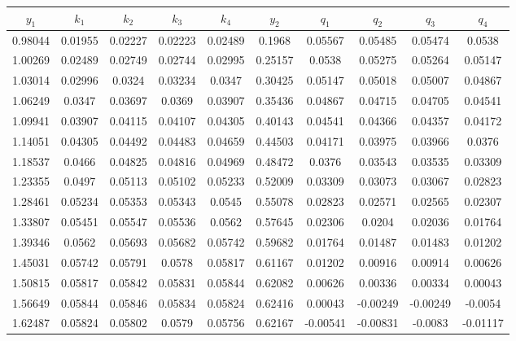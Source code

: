 \renewcommand{\arraystretch}{1.284}
\begin{center}
	\begin{table}[htbp]
		\footnotesize
		\begin{tabular}{|c|c|c|c|c|c|c|c|c|c|}
			\hline
			$ y_{1} $ & $ k_{1} $ & $ k_{2} $ & $ k_{3} $ & $ k_{4} $ & $ y_{2} $ & $ q_{1} $ & $ q_{2} $ & $ q_{3} $ & $ q_{4} $ \\
			\hline
			0.98044 & 0.01955 & 0.02227 & 0.02223 & 0.02489 & 0.1968 & 0.05567 & 0.05485 & 0.05474 & 0.0538 \\
			\hline
			1.00269 & 0.02489 & 0.02749 & 0.02744 & 0.02995 & 0.25157 & 0.0538 & 0.05275 & 0.05264 & 0.05147 \\
			\hline
			1.03014 & 0.02996 & 0.0324 & 0.03234 & 0.0347 & 0.30425 & 0.05147 & 0.05018 & 0.05007 & 0.04867 \\
			\hline
			1.06249 & 0.0347 & 0.03697 & 0.0369 & 0.03907 & 0.35436 & 0.04867 & 0.04715 & 0.04705 & 0.04541 \\
			\hline
			1.09941 & 0.03907 & 0.04115 & 0.04107 & 0.04305 & 0.40143 & 0.04541 & 0.04366 & 0.04357 & 0.04172 \\
			\hline
			1.14051 & 0.04305 & 0.04492 & 0.04483 & 0.04659 & 0.44503 & 0.04171 & 0.03975 & 0.03966 & 0.0376 \\
			\hline
			1.18537 & 0.0466 & 0.04825 & 0.04816 & 0.04969 & 0.48472 & 0.0376 & 0.03543 & 0.03535 & 0.03309 \\
			\hline
			1.23355 & 0.0497 & 0.05113 & 0.05102 & 0.05233 & 0.52009 & 0.03309 & 0.03073 & 0.03067 & 0.02823 \\
			\hline
			1.28461 & 0.05234 & 0.05353 & 0.05343 & 0.0545 & 0.55078 & 0.02823 & 0.02571 & 0.02565 & 0.02307 \\
			\hline
			1.33807 & 0.05451 & 0.05547 & 0.05536 & 0.0562 & 0.57645 & 0.02306 & 0.0204 & 0.02036 & 0.01764 \\
			\hline
			1.39346 & 0.0562 & 0.05693 & 0.05682 & 0.05742 & 0.59682 & 0.01764 & 0.01487 & 0.01483 & 0.01202 \\
			\hline
			1.45031 & 0.05742 & 0.05791 & 0.0578 & 0.05817 & 0.61167 & 0.01202 & 0.00916 & 0.00914 & 0.00626 \\
			\hline
			1.50815 & 0.05817 & 0.05842 & 0.05831 & 0.05844 & 0.62082 & 0.00626 & 0.00336 & 0.00334 & 0.00043 \\
			\hline
			1.56649 & 0.05844 & 0.05846 & 0.05834 & 0.05824 & 0.62416 & 0.00043 & -0.00249 & -0.00249 & -0.0054 \\
			\hline
			1.62487 & 0.05824 & 0.05802 & 0.0579 & 0.05756 & 0.62167 & -0.00541 & -0.00831 & -0.0083 & -0.01117 \\

\end{tabular}
\end{table}
\end{center}
